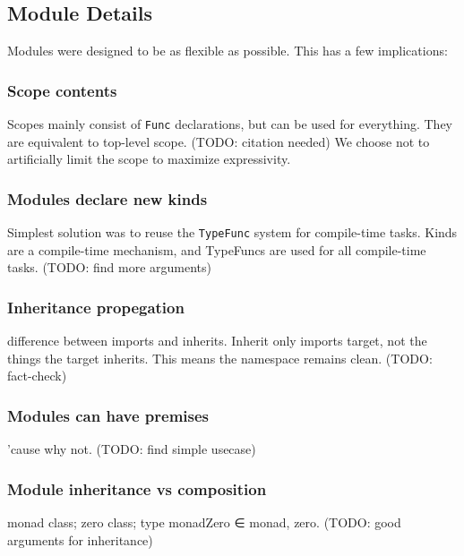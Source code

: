 \subsection{Module Details}
\begin{multicols}{2}\noindent
  Modules were designed to be as flexible as possible.
  This has a few implications:

  \subsubsection*{Scope contents}
  Scopes mainly consist of \texttt{Func} declarations, but can be used for everything.
  They are equivalent to top-level scope. (TODO: citation needed) 
  We choose not to artificially limit the scope to maximize expressivity.

  \subsubsection*{Modules declare new kinds}
  Simplest solution was to reuse the \texttt{TypeFunc} system for compile-time tasks.
  Kinds are a compile-time mechanism, and TypeFuncs are used for all compile-time tasks.
  (TODO: find more arguments)

  \subsubsection*{Inheritance propegation}
  difference between imports and inherits.
  Inherit only imports target, not the things the target inherits.
  This means the namespace remains clean. (TODO: fact-check)

  \subsubsection*{Modules can have premises}
  'cause why not. (TODO: find simple usecase)

  \subsubsection*{Module inheritance vs composition}
  monad class; zero class; type monadZero ∈ monad, zero.
  (TODO: good arguments for inheritance)

\end{multicols}


